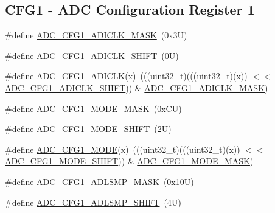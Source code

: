 \subsection*{C\+F\+G1 -\/ A\+DC Configuration Register 1}
\begin{DoxyCompactItemize}
\item 
\#define \mbox{\hyperlink{group___a_d_c___register___masks_ga849c3ef9995df85776d7d739475cfdd0}{A\+D\+C\+\_\+\+C\+F\+G1\+\_\+\+A\+D\+I\+C\+L\+K\+\_\+\+M\+A\+SK}}~(0x3\+U)
\item 
\#define \mbox{\hyperlink{group___a_d_c___register___masks_ga889634c9b4122a2d39f3a986688a1662}{A\+D\+C\+\_\+\+C\+F\+G1\+\_\+\+A\+D\+I\+C\+L\+K\+\_\+\+S\+H\+I\+FT}}~(0\+U)
\item 
\#define \mbox{\hyperlink{group___a_d_c___register___masks_ga1f7b28bec60a20af8775724a4b33a6e6}{A\+D\+C\+\_\+\+C\+F\+G1\+\_\+\+A\+D\+I\+C\+LK}}(x)~(((uint32\+\_\+t)(((uint32\+\_\+t)(x)) $<$$<$ \mbox{\hyperlink{group___a_d_c___register___masks_ga889634c9b4122a2d39f3a986688a1662}{A\+D\+C\+\_\+\+C\+F\+G1\+\_\+\+A\+D\+I\+C\+L\+K\+\_\+\+S\+H\+I\+FT}})) \& \mbox{\hyperlink{group___a_d_c___register___masks_ga849c3ef9995df85776d7d739475cfdd0}{A\+D\+C\+\_\+\+C\+F\+G1\+\_\+\+A\+D\+I\+C\+L\+K\+\_\+\+M\+A\+SK}})
\item 
\#define \mbox{\hyperlink{group___a_d_c___register___masks_gad484c90743265c228af52bf695aaec83}{A\+D\+C\+\_\+\+C\+F\+G1\+\_\+\+M\+O\+D\+E\+\_\+\+M\+A\+SK}}~(0x\+C\+U)
\item 
\#define \mbox{\hyperlink{group___a_d_c___register___masks_ga0dc0ce86ab632e5fa2344da9f8617f64}{A\+D\+C\+\_\+\+C\+F\+G1\+\_\+\+M\+O\+D\+E\+\_\+\+S\+H\+I\+FT}}~(2\+U)
\item 
\#define \mbox{\hyperlink{group___a_d_c___register___masks_gabdbbdc3e2263f1d453aac3fef184d997}{A\+D\+C\+\_\+\+C\+F\+G1\+\_\+\+M\+O\+DE}}(x)~(((uint32\+\_\+t)(((uint32\+\_\+t)(x)) $<$$<$ \mbox{\hyperlink{group___a_d_c___register___masks_ga0dc0ce86ab632e5fa2344da9f8617f64}{A\+D\+C\+\_\+\+C\+F\+G1\+\_\+\+M\+O\+D\+E\+\_\+\+S\+H\+I\+FT}})) \& \mbox{\hyperlink{group___a_d_c___register___masks_gad484c90743265c228af52bf695aaec83}{A\+D\+C\+\_\+\+C\+F\+G1\+\_\+\+M\+O\+D\+E\+\_\+\+M\+A\+SK}})
\item 
\#define \mbox{\hyperlink{group___a_d_c___register___masks_ga3f96490246c5bef5f9ccede781423b22}{A\+D\+C\+\_\+\+C\+F\+G1\+\_\+\+A\+D\+L\+S\+M\+P\+\_\+\+M\+A\+SK}}~(0x10\+U)
\item 
\#define \mbox{\hyperlink{group___a_d_c___register___masks_gab2cd2b0ee8a3e6c0e3710e5477ba4f25}{A\+D\+C\+\_\+\+C\+F\+G1\+\_\+\+A\+D\+L\+S\+M\+P\+\_\+\+S\+H\+I\+FT}}~(4\+U)

\end{DoxyCompactItemize}
